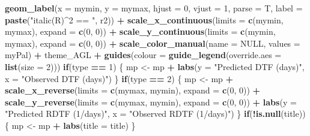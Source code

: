 \documentclass[
]{article}
\newenvironment{Shaded}{\begin{snugshade}}{\end{snugshade}}
\newcommand{\ControlFlowTok}[1]{\textcolor[rgb]{0.13,0.29,0.53}{\textbf{#1}}}
\newcommand{\DataTypeTok}[1]{\textcolor[rgb]{0.13,0.29,0.53}{#1}}
\newcommand{\DecValTok}[1]{\textcolor[rgb]{0.00,0.00,0.81}{#1}}
\newcommand{\KeywordTok}[1]{\textcolor[rgb]{0.13,0.29,0.53}{\textbf{#1}}}
\newcommand{\NormalTok}[1]{#1}
\newcommand{\OperatorTok}[1]{\textcolor[rgb]{0.81,0.36,0.00}{\textbf{#1}}}
\newcommand{\OtherTok}[1]{\textcolor[rgb]{0.56,0.35,0.01}{#1}}
\newcommand{\StringTok}[1]{\textcolor[rgb]{0.31,0.60,0.02}{#1}}
\begin{document}
\begin{Shaded}
\begin{Highlighting}[]
{{{{\StringTok{    }\KeywordTok{geom_label}\NormalTok{(}\DataTypeTok{x =}\NormalTok{ mymin, }\DataTypeTok{y =}\NormalTok{ mymax, }\DataTypeTok{hjust =} \DecValTok{0}\NormalTok{, }\DataTypeTok{vjust =} \DecValTok{1}\NormalTok{, }\DataTypeTok{parse =}\NormalTok{ T,}
               \DataTypeTok{label =} \KeywordTok{paste}\NormalTok{(}\StringTok{"italic(R)^2 == "}\NormalTok{, r2)) }\OperatorTok{+}
\StringTok{    }\KeywordTok{scale_x_continuous}\NormalTok{(}\DataTypeTok{limits =} \KeywordTok{c}\NormalTok{(mymin, mymax), }\DataTypeTok{expand =} \KeywordTok{c}\NormalTok{(}\DecValTok{0}\NormalTok{, }\DecValTok{0}\NormalTok{)) }\OperatorTok{+}
\StringTok{    }\KeywordTok{scale_y_continuous}\NormalTok{(}\DataTypeTok{limits =} \KeywordTok{c}\NormalTok{(mymin, mymax), }\DataTypeTok{expand =} \KeywordTok{c}\NormalTok{(}\DecValTok{0}\NormalTok{, }\DecValTok{0}\NormalTok{)) }\OperatorTok{+}
\StringTok{    }\KeywordTok{scale_color_manual}\NormalTok{(}\DataTypeTok{name =} \OtherTok{NULL}\NormalTok{, }\DataTypeTok{values =}\NormalTok{ myPal) }\OperatorTok{+}
\StringTok{    }\NormalTok{theme_AGL }\OperatorTok{+}\StringTok{ }\KeywordTok{guides}\NormalTok{(}\DataTypeTok{colour =} \KeywordTok{guide_legend}\NormalTok{(}\DataTypeTok{override.aes =} \KeywordTok{list}\NormalTok{(}\DataTypeTok{size =} \DecValTok{2}\NormalTok{)))}
  \ControlFlowTok{if}\NormalTok{(type }\OperatorTok{==}\StringTok{ }\DecValTok{1}\NormalTok{) \{ }
\NormalTok{    mp <-}\StringTok{ }\NormalTok{mp }\OperatorTok{+}\StringTok{ }\KeywordTok{labs}\NormalTok{(}\DataTypeTok{y =} \StringTok{"Predicted DTF (days)"}\NormalTok{, }\DataTypeTok{x =} \StringTok{"Observed DTF (days)"}\NormalTok{)}
\NormalTok{  \}}
  \ControlFlowTok{if}\NormalTok{(type }\OperatorTok{==}\StringTok{ }\DecValTok{2}\NormalTok{) \{ }
\NormalTok{    mp <-}\StringTok{ }\NormalTok{mp }\OperatorTok{+}\StringTok{ }
\StringTok{      }\KeywordTok{scale_x_reverse}\NormalTok{(}\DataTypeTok{limits =} \KeywordTok{c}\NormalTok{(mymax, mymin), }\DataTypeTok{expand =} \KeywordTok{c}\NormalTok{(}\DecValTok{0}\NormalTok{, }\DecValTok{0}\NormalTok{)) }\OperatorTok{+}\StringTok{ }
\StringTok{      }\KeywordTok{scale_y_reverse}\NormalTok{(}\DataTypeTok{limits =} \KeywordTok{c}\NormalTok{(mymax, mymin), }\DataTypeTok{expand =} \KeywordTok{c}\NormalTok{(}\DecValTok{0}\NormalTok{, }\DecValTok{0}\NormalTok{)) }\OperatorTok{+}
\StringTok{      }\KeywordTok{labs}\NormalTok{(}\DataTypeTok{y =} \StringTok{"Predicted RDTF (1/days)"}\NormalTok{, }\DataTypeTok{x =} \StringTok{"Observed RDTF (1/days)"}\NormalTok{)}
\NormalTok{  \}}
  \ControlFlowTok{if}\NormalTok{(}\OperatorTok{!}\KeywordTok{is.null}\NormalTok{(title)) \{ mp <-}\StringTok{ }\NormalTok{mp }\OperatorTok{+}\StringTok{ }\KeywordTok{labs}\NormalTok{(}\DataTypeTok{title =}\NormalTok{ title) \}}
}}}}
\end{Highlighting}
\end{Shaded}
\end{document}
